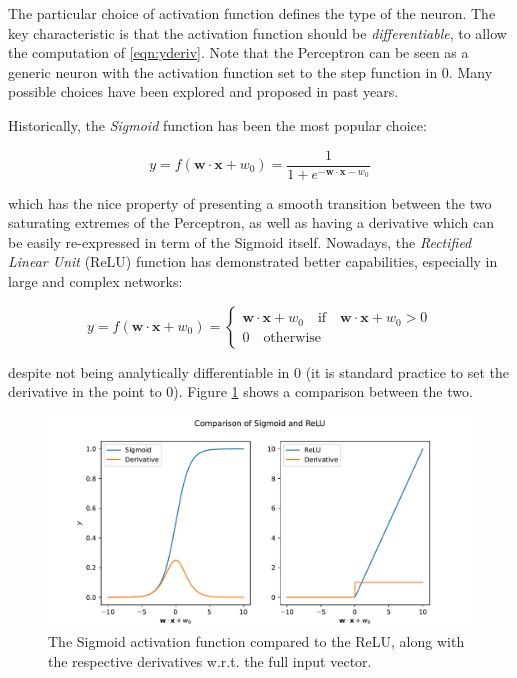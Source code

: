 The particular choice of activation function defines the type of the neuron. The key characteristic is that the activation function should be \emph{differentiable}, to allow the computation of \eqref{eqn:yderiv}. Note that the Perceptron can be seen as a generic neuron with the activation function set to the step function in $0$. Many possible choices have been explored and proposed in past years.

Historically, the \emph{Sigmoid} function has been the most popular choice:

\[
y=f(\mathbf{w}\cdot\mathbf{x} + w_0) = \frac{1}{1 + e^{-\mathbf{w}\cdot\mathbf{x} - w_0}}
\]

which has the nice property of presenting a smooth transition between the two saturating extremes of the Perceptron, as well as having a derivative which can be easily re-expressed in term of the Sigmoid itself. Nowadays, the \emph{Rectified Linear Unit} (ReLU) function has demonstrated better capabilities, especially in large and complex networks:

\[
y=f(\mathbf{w}\cdot\mathbf{x} + w_0) = 
\begin{cases}
\mathbf{w}\cdot\mathbf{x} + w_0 \quad \text{if} \quad \mathbf{w}\cdot\mathbf{x} + w_0 > 0 \\
0 \quad \text{otherwise}
\end{cases}
\]

despite not being analytically differentiable in $0$ (it is standard practice to set the derivative in the point to $0$). Figure \ref{fig:actfunc} shows a comparison between the two.

\begin{figure}
    \centering
    \includegraphics[width=\columnwidth]{gfx/ch3/activ.pdf}
    \caption[Activation functions]{The Sigmoid activation function compared to the ReLU, along with the respective derivatives w.r.t. the full input vector.}
    \label{fig:actfunc}
\end{figure}

